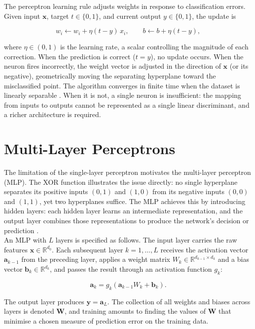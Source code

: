     \noindent
    The perceptron learning rule adjusts weights in response to classification errors. Given input $\mathbf{x}$, target $t \in \{0, 1\}$, and current output $y \in \{0, 1\}$, the update is

    \[
    w_i \leftarrow w_i + \eta(t - y)\, x_i, \qquad b \leftarrow b + \eta(t - y),
    \]

    \noindent 
    where $\eta \in (0, 1)$ is the learning rate, a scalar controlling the magnitude of each correction. When the prediction is correct ($t = y$), no update occurs. When the neuron fires incorrectly, the weight vector is adjusted in the direction of $\mathbf{x}$ (or its negative), geometrically moving the separating hyperplane toward the misclassified point. The algorithm converges in finite time when the dataset is linearly separable \citep{goodfellow2016deep}. When it is not, a single neuron is insufficient: the mapping from inputs to outputs cannot be represented as a single linear discriminant, and a richer architecture is required. \\

    \section*{Multi-Layer Perceptrons}

    The limitation of the single-layer perceptron motivates the multi-layer perceptron (MLP). The XOR function illustrates the issue directly: no single hyperplane separates its positive inputs $(0,1)$ and $(1,0)$ from its negative inputs $(0,0)$ and $(1,1)$, yet two hyperplanes suffice. The MLP achieves this by introducing hidden layers: each hidden layer learns an intermediate representation, and the output layer combines those representations to produce the network's decision or prediction \citep{rumelhart1986learning}. \\


    \noindent
    An MLP with $L$ layers is specified as follows. The input layer carries the raw features $\mathbf{x} \in \mathbb{R}^{d_0}$. Each subsequent layer $k = 1, \ldots, L$ receives the activation vector $\mathbf{a}_{k-1}$ from the preceding layer, applies a weight matrix $W_k \in \mathbb{R}^{d_{k-1} \times d_k}$ and a bias vector $\mathbf{b}_k \in \mathbb{R}^{d_k}$, and passes the result through an activation function $g_k$:

    \[
    \mathbf{a}_k = g_k\!\left(\mathbf{a}_{k-1} W_k + \mathbf{b}_k\right).
    \]

    \noindent
    The output layer produces $\mathbf{y} = \mathbf{a}_L$. The collection of all weights and biases across layers is denoted $\mathbf{W}$, and training amounts to finding the values of $\mathbf{W}$ that minimise a chosen measure of prediction error on the training data.

